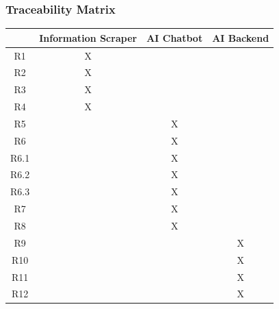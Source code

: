 \documentclass[11pt]{article}
\begin{document}
\subsubsection{Traceability Matrix}
\begin{center}
	\begin{tabular}{||c | c | c | c ||} 
		\hline
		     & Information Scraper & AI Chatbot & AI Backend \\
		\hline\hline
		R1   & X                   &            &            \\
		\hline
		R2   & X                   &            &            \\
		\hline
		R3   & X                   &            &            \\
		\hline
		R4   & X                   &            &            \\
		\hline
		R5   &                     & X          &            \\
		\hline
		R6   &                     & X          &            \\
		\hline
		R6.1 &                     & X          &            \\
		\hline
		R6.2 &                     & X          &            \\
		\hline
		R6.3 &                     & X          &            \\
		\hline
		R7   &                     & X          &            \\
		\hline
		R8   &                     & X          &            \\
		\hline
		R9   &                     &            & X          \\
		\hline
		R10  &                     &            & X          \\
		\hline
		R11  &                     &            & X          \\
		\hline
		R12  &                     &            & X          \\
		\hline
		
	\end{tabular}
\end{center}

\end{document}
